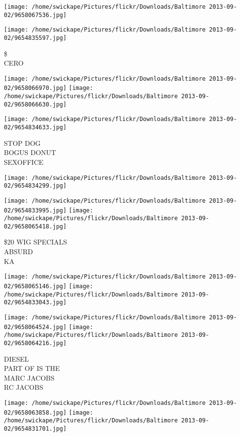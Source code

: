 \documentclass[10pt,letterpaper]{article}
\begin{document}
\texttt{[image: /home/swickape/Pictures/flickr/Downloads/Baltimore 2013-09-02/9658067536.jpg]}

\vspace{0.25in}
\texttt{[image: /home/swickape/Pictures/flickr/Downloads/Baltimore 2013-09-02/9654835597.jpg]}

\$\\
CERO
\pagebreak

\texttt{[image: /home/swickape/Pictures/flickr/Downloads/Baltimore 2013-09-02/9658066970.jpg]}
\texttt{[image: /home/swickape/Pictures/flickr/Downloads/Baltimore 2013-09-02/9658066630.jpg]}

\texttt{[image: /home/swickape/Pictures/flickr/Downloads/Baltimore 2013-09-02/9654834633.jpg]}

STOP DOG\\
BOGUS DONUT\\
SEXOFFICE
\pagebreak

\texttt{[image: /home/swickape/Pictures/flickr/Downloads/Baltimore 2013-09-02/9654834299.jpg]}

\vspace{0.25in}
\texttt{[image: /home/swickape/Pictures/flickr/Downloads/Baltimore 2013-09-02/9654833995.jpg]}
\texttt{[image: /home/swickape/Pictures/flickr/Downloads/Baltimore 2013-09-02/9658065418.jpg]}

\$20 WIG SPECIALS\\
ABSURD\\
KA
\pagebreak

\texttt{[image: /home/swickape/Pictures/flickr/Downloads/Baltimore 2013-09-02/9658065146.jpg]}
\texttt{[image: /home/swickape/Pictures/flickr/Downloads/Baltimore 2013-09-02/9654833043.jpg]}

\texttt{[image: /home/swickape/Pictures/flickr/Downloads/Baltimore 2013-09-02/9658064524.jpg]}
\texttt{[image: /home/swickape/Pictures/flickr/Downloads/Baltimore 2013-09-02/9658064216.jpg]}

DIESEL\\
PART OF IS THE\\
MARC JACOBS\\
RC JACOBS
\pagebreak

\texttt{[image: /home/swickape/Pictures/flickr/Downloads/Baltimore 2013-09-02/9658063858.jpg]}
\texttt{[image: /home/swickape/Pictures/flickr/Downloads/Baltimore 2013-09-02/9654831701.jpg]}
\end{document}
